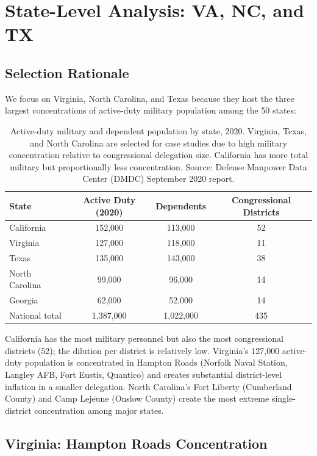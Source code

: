 \section{State-Level Analysis: VA, NC, and TX}
\label{sec:state-analysis}

\subsection{Selection Rationale}

We focus on Virginia, North Carolina, and Texas because they host the three largest concentrations of active-duty military population among the 50 states:

\begin{table}[h]
\centering
\begin{tabular}{lccc}
\toprule
\textbf{State} & \textbf{Active Duty (2020)} & \textbf{Dependents} & \textbf{Congressional Districts} \\
\midrule
California & 152,000 & 113,000 & 52 \\
Virginia & 127,000 & 118,000 & 11 \\
Texas & 135,000 & 143,000 & 38 \\
North Carolina & 99,000 & 96,000 & 14 \\
Georgia & 62,000 & 52,000 & 14 \\
\midrule
National total & 1,387,000 & 1,022,000 & 435 \\
\bottomrule
\end{tabular}
\caption{Active-duty military and dependent population by state, 2020. Virginia, Texas, and North Carolina are selected for case studies due to high military concentration relative to congressional delegation size. California has more total military but proportionally less concentration. Source: Defense Manpower Data Center (DMDC) September 2020 report.}
\label{tab:state-military}
\end{table}

California has the most military personnel but also the most congressional districts (52); the dilution per district is relatively low. Virginia's 127,000 active-duty population is concentrated in Hampton Roads (Norfolk Naval Station, Langley AFB, Fort Eustis, Quantico) and creates substantial district-level inflation in a smaller delegation. North Carolina's Fort Liberty (Cumberland County) and Camp Lejeune (Onslow County) create the most extreme single-district concentration among major states.

\subsection{Virginia: Hampton Roads Concentration}

